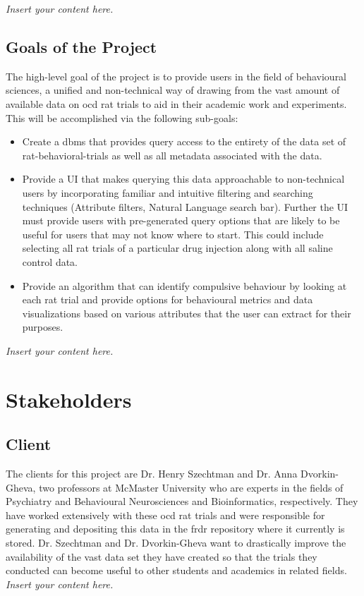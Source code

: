 \documentclass[12pt]{article}
\newcommand{\lips}{\textit{Insert your content here.}}
\begin{document}
\lips

\subsection{Goals of the Project}

\par{The high-level goal of the project is to provide users in the field of behavioural sciences,
a unified and non-technical way of drawing from the vast amount of available data on \gls{ocd} rat trials
to aid in their academic work and experiments. This will be accomplished via the following sub-goals:}

\begin{itemize}
    \item Create a \gls{dbms} that provides \gls{query} access to the entirety of the data set of \gls{rat-behavioral-trials} as well as all \gls{metadata} associated with the data.
    \item Provide a UI that makes querying this data approachable to non-technical users by incorporating familiar and intuitive filtering and searching techniques
    (Attribute filters, Natural Language search bar). Further the UI must provide users with pre-generated query options that are likely to
    be useful for users that may not know where to start. This could include selecting all rat trials of a particular drug injection along with
    all saline control data.
    \item Provide an algorithm that can identify compulsive behaviour by looking at each rat trial
    and provide options for behavioural metrics and data visualizations based on various attributes that the user can extract 
    for their purposes.
\end{itemize}


\lips
\section{Stakeholders}
\subsection{Client}

\par{The clients for this project are Dr. Henry Szechtman and Dr. Anna Dvorkin-Gheva, two professors at McMaster University who are experts in
the fields of Psychiatry and Behavioural Neurosciences and Bioinformatics, respectively. They have worked extensively with these \gls{ocd} rat trials and
were responsible for generating and depositing this data in the \gls{frdr} repository where it currently is stored. Dr. Szechtman and Dr. Dvorkin-Gheva want
to drastically improve the availability of the vast data set they have created so that the trials they conducted can become useful to other students and academics in related fields.}
\lips
\end{document}

